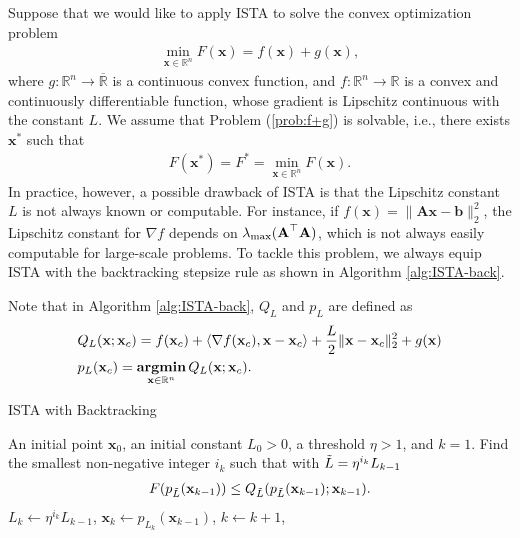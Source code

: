 \documentclass[11pt,letter,notitlepage]{article}
\DeclareMathOperator*{\argmin}{\bf argmin}
\begin{document}
\newpage
\begin{exercise}\label{exercise:ISTA-backtracking}
Suppose that we would like to apply ISTA to solve the convex optimization problem
\begin{align}\label{prob:f+g}
    \min_{\textbf{x}\in\mathbb{R}^n} F(\textbf{x})=f(\textbf{x})+g(\textbf{x}),
\end{align}
where $g:\mathbb{R}^n\to\overline{\mathbb{R}}$ is a continuous convex function, and $f:\mathbb{R}^n\to\mathbb{R}$ is a convex and continuously differentiable function, whose gradient is Lipschitz continuous with the constant $L$. We assume that Problem (\ref{prob:f+g}) is solvable, i.e., there exists $\textbf{x}^*$ such that
\begin{align*}
    F(\textbf{x}^*)=F^*=\min_{\textbf{x}\in\mathbb{R}^n} F(
    \textbf{x}).
\end{align*}
In practice, however, a possible drawback of ISTA is that the Lipschitz constant $L$ is not always known or computable. For instance, if $f(\textbf{x})=\|\textbf{A}\textbf{x}-\textbf{b}\|_2^2$, the Lipschitz constant for $\nabla f$ depends on $\lambda_{\rm max}(\textbf{A}^\top\textbf{A})$, which is not always easily computable for large-scale problems. To tackle this problem, we always equip ISTA with the backtracking stepsize rule as shown in Algorithm \ref{alg:ISTA-back}.
\par Note that in Algorithm \ref{alg:ISTA-back}, $Q_L$ and $p_L$ are defined as
\begin{align*}
    &Q_{L}(\textbf{x};\textbf{x}_c)=f(\textbf{x}_c)+\langle\nabla f(\textbf{x}_c),\textbf{x}-\textbf{x}_c\rangle+\frac{L}{2}\|\textbf{x}-\textbf{x}_c\|_2^2+g(\textbf{x})\\
    &p_L(\textbf{x}_c)=\argmin_{\textbf{x}\in\mathbb{R}^n} Q_L(\textbf{x};\textbf{x}_c).
\end{align*}

\begin{algorithm}[H]
	\caption{ISTA with Backtracking}\label{alg:ISTA-back}
	\begin{algorithmic}[1]
		 An initial point $\mathbf{x}_0$, an initial  constant $L_0>0$, a threshold $\eta>1$, and $k=1$.
		    \STATE Find the smallest non-negative integer $i_k$ such that with $\Tilde{L}=\eta^{i_k}L_{k-1}$
		    \begin{align}\label{eqn:FQ}
		        F(p_{\Tilde{L}}(\textbf{x}_{k-1}))\le Q_{\Tilde{L}}(p_{\Tilde{L}}(\textbf{x}_{k-1});\textbf{x}_{k-1}).
		    \end{align}
		    \STATE $L_k\leftarrow \eta^{i_k}L_{k-1}$, $\textbf{x}_k\leftarrow p_{L_k}(\textbf{x}_{k-1})$,
		    \STATE $k \leftarrow k+1$,
		\ENDWHILE
		

\end{algorithmic}
\end{algorithm}
\end{exercise}
\end{document}
